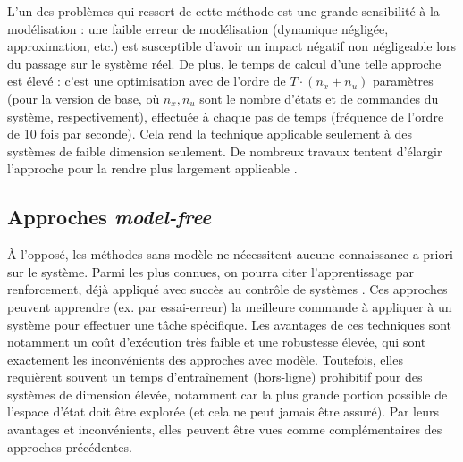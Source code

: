 \documentclass[a4paper,12pt]{report}
\begin{document}
L'un des problèmes qui ressort de cette méthode est une grande sensibilité à la modélisation : une faible erreur de modélisation (dynamique négligée, approximation, etc.) est susceptible d'avoir un impact négatif non négligeable lors du passage sur le système réel. De plus, le temps de calcul d'une telle approche est élevé : c'est une optimisation avec de l'ordre de $T \cdot (n_x + n_u)$ paramètres (pour la version de base, où $n_x, n_u$ sont le nombre d'états et de commandes du système, respectivement), effectuée à chaque pas de temps (fréquence de l'ordre de 10 fois par seconde). Cela rend la technique applicable seulement à des systèmes de faible dimension seulement. De nombreux travaux tentent d'élargir l'approche pour la rendre plus largement applicable \cite{mpc}.



\subsection{Approches \textit{model-free}}
À l'opposé, les méthodes sans modèle ne nécessitent aucune connaissance a priori sur le système. Parmi les plus connues, on pourra citer l'apprentissage par renforcement, déjà appliqué avec succès au contrôle de systèmes \cite{reinforcement_learning}. Ces approches peuvent apprendre (ex. par essai-erreur) la meilleure commande à appliquer à un système pour effectuer une tâche spécifique. Les avantages de ces techniques sont notamment un coût d'exécution très faible et une robustesse élevée, qui sont exactement les inconvénients des approches avec modèle. Toutefois, elles requièrent souvent un temps d'entraînement (hors-ligne) prohibitif pour des systèmes de dimension élevée, notamment car la plus grande portion possible de l'espace d'état doit être explorée (et cela ne peut jamais être assuré). Par leurs avantages et inconvénients, elles peuvent être vues comme complémentaires des approches précédentes.
\end{document}
